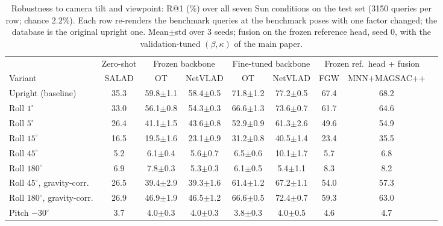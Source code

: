 \begin{table}[t]
\centering
\caption{Robustness to camera tilt and viewpoint: R@1 (\%) over all seven Sun conditions on the test set (3150 queries per row; chance $2.2\%$). Each row re-renders the benchmark queries at the benchmark poses with one factor changed; the database is the original upright one. Mean$\pm$std over 3 seeds; fusion on the frozen reference head, seed 0, with the validation-tuned $(\beta,\kappa)$ of the main paper.}
\label{tab:robust}
\footnotesize
\begin{tabular}{@{}lcccccccc@{}}
\toprule
 & Zero-shot & \multicolumn{2}{c}{Frozen backbone} & \multicolumn{2}{c}{Fine-tuned backbone} & \multicolumn{2}{c}{Frozen ref.\ head + fusion} \\
\cmidrule(lr){3-4}\cmidrule(lr){5-6}\cmidrule(l){7-8}
Variant & SALAD & OT & NetVLAD & OT & NetVLAD & FGW & MNN+MAGSAC++ \\
\midrule
Upright (baseline) & 35.3 & 59.8{\scriptsize$\pm$1.1} & 58.4{\scriptsize$\pm$0.5} & 71.8{\scriptsize$\pm$1.2} & 77.2{\scriptsize$\pm$0.5} & 67.4 & 68.2 \\
\addlinespace[2pt]
Roll $1^\circ$ & 33.0 & 56.1{\scriptsize$\pm$0.8} & 54.3{\scriptsize$\pm$0.3} & 66.6{\scriptsize$\pm$1.3} & 73.6{\scriptsize$\pm$0.7} & 61.7 & 64.6 \\
Roll $5^\circ$ & 26.4 & 41.1{\scriptsize$\pm$1.5} & 43.6{\scriptsize$\pm$0.8} & 52.9{\scriptsize$\pm$0.9} & 61.3{\scriptsize$\pm$2.6} & 49.6 & 54.9 \\
Roll $15^\circ$ & 16.5 & 19.5{\scriptsize$\pm$1.6} & 23.1{\scriptsize$\pm$0.9} & 31.2{\scriptsize$\pm$0.8} & 40.5{\scriptsize$\pm$1.4} & 23.4 & 35.5 \\
Roll $45^\circ$ & 5.2 & 6.1{\scriptsize$\pm$0.4} & 5.6{\scriptsize$\pm$0.7} & 6.5{\scriptsize$\pm$0.6} & 10.1{\scriptsize$\pm$1.7} & 5.7 & 6.8 \\
Roll $180^\circ$ & 6.9 & 7.8{\scriptsize$\pm$0.3} & 5.3{\scriptsize$\pm$0.3} & 6.1{\scriptsize$\pm$0.5} & 5.4{\scriptsize$\pm$1.1} & 8.3 & 8.2 \\
\addlinespace[2pt]
Roll $45^\circ$, gravity-corr. & 26.5 & 39.4{\scriptsize$\pm$2.9} & 39.3{\scriptsize$\pm$1.6} & 61.4{\scriptsize$\pm$1.2} & 67.2{\scriptsize$\pm$1.1} & 54.0 & 57.3 \\
Roll $180^\circ$, gravity-corr. & 26.9 & 46.9{\scriptsize$\pm$1.9} & 46.5{\scriptsize$\pm$1.2} & 66.6{\scriptsize$\pm$0.5} & 72.4{\scriptsize$\pm$0.7} & 59.3 & 63.0 \\
\addlinespace[2pt]
Pitch $-30^\circ$ & 3.7 & 4.0{\scriptsize$\pm$0.3} & 4.0{\scriptsize$\pm$0.3} & 3.8{\scriptsize$\pm$0.3} & 4.0{\scriptsize$\pm$0.5} & 4.6 & 4.7 \\

\end{tabular}
\end{table}
